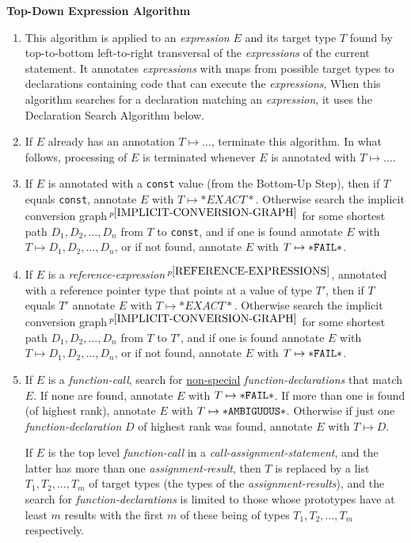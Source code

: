 \documentclass[12pt]{article}
\newcommand{\pagnote}[1]{$\,^{p\pageref{#1}}$}
\begin{document}
\bigskip

\centerline{\bf Top-Down Expression Algorithm}
\begin{enumerate}

\item This algorithm is applied to an {\em expression} $E$ and its
target type $T$ found by
top-to-bottom left-to-right transversal of the {\em expressions} of the
current statement.  It annotates {\em expressions} with maps from
possible target types to declarations containing code that can execute
the {\em expressions},
When this algorithm searches for a declaration matching an {\em expression},
it uses the Declaration Search Algorithm below.

\item If $E$ already has an annotation $T\mapsto \ldots$,
terminate this algorithm.  In what follows, processing of $E$ is
terminated whenever $E$ is annotated with $T\mapsto \ldots$.

\item If $E$ is annotated with a {\tt const} value
(from the Bottom-Up Step), then if $T$ equals {\tt const},
annotate $E$ with $T\mapsto{*EXACT*}$.
Otherwise search the implicit conversion
graph\pagnote{IMPLICIT-CONVERSION-GRAPH}
for some shortest path $D_1,D_2,\ldots,D_n$ from $T$ to {\tt const},
and if one is found annotate $E$ with $T\mapsto D_1,D_2,\ldots,D_n$,
or if not found,
annotate $E$ with $T\mapsto {\tt *FAIL*}$.

\item If $E$ is a
{\em reference-expression}\pagnote{REFERENCE-EXPRESSIONS},
annotated with a reference pointer type that points at a value
of type $T'$,
then if $T$ equals $T'$ annotate $E$ with $T\mapsto{*EXACT*}$.
Otherwise search the implicit conversion
graph\pagnote{IMPLICIT-CONVERSION-GRAPH}
for some shortest path $D_1,D_2,\ldots,D_n$ from $T$ to $T'$,
and if one is found annotate $E$ with $T\mapsto D_1,D_2,\ldots,D_n$,
or if not found,
annotate $E$ with $T\mapsto {\tt *FAIL*}$.

\item If $E$ is a {\em function-call}, search for \underline{non-special}
{\em function-declarations}
that match $E$.
If none are found,
annotate $E$ with $T\mapsto{\tt *FAIL*}$.
If more than one is found (of highest rank),
annotate $E$ with $T\mapsto{\tt *AMBIGUOUS*}$.
Otherwise if just one {\em function-declaration} $D$ of highest rank was found,
annotate $E$ with $T\mapsto D$.

If $E$ is the top level {\em function-call}
in a {\em call-assignment-statement}, and the latter has
more than one {\em assignment-result}, then $T$ is replaced by a list
$T_1,T_2,\ldots,T_m$ of target types (the types of the
{\em assignment-results}), and the search for
{\em function-declarations} is limited to those whose prototypes have
at least $m$ results with the first $m$ of these being of types
$T_1,T_2,\ldots,T_m$ respectively.

\end{enumerate}
\end{document}
